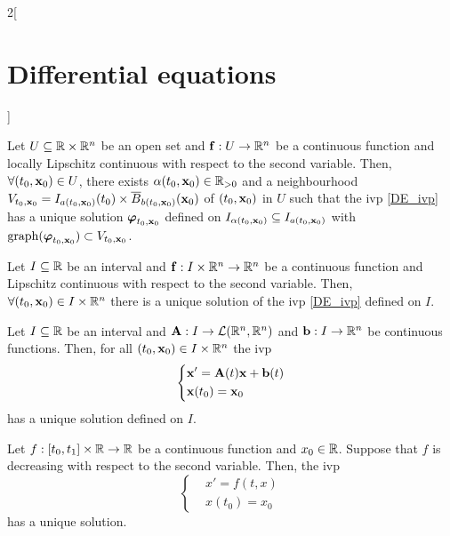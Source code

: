 \documentclass[../../../main.tex]{subfiles}
\begin{document}
\begin{multicols}{2}[\section{Differential equations}]
\begin{corollary}
    Let $U\subseteq\mathbb{R}\times\mathbb{R}^n$ be an open set and $\boldsymbol{\mathrm{f}}:U\rightarrow\mathbb{R}^n$ be a continuous function and locally Lipschitz continuous with respect to the second variable. Then, $\forall(t_0,\boldsymbol{\mathrm{x}}_0)\in U$, there exists $\alpha(t_0,\boldsymbol{\mathrm{x}}_0)\in\mathbb{R}_{>0}$ and a neighbourhood $V_{t_0,\boldsymbol{\mathrm{x}}_0}=I_{a(t_0,\boldsymbol{\mathrm{x}}_0)}(t_0)\times\overline{B}_{b(t_0,\boldsymbol{\mathrm{x}}_0)}(\boldsymbol{\mathrm{x}}_0)$ of $(t_0,\boldsymbol{\mathrm{x}}_0)$ in $U$ such that the ivp \eqref{DE_ivp} has a unique solution $\boldsymbol{\mathrm{\varphi}}_{t_0,\boldsymbol{\mathrm{x}}_0}$ defined on $I_{\alpha(t_0,\boldsymbol{\mathrm{x}}_0)}\subseteq I_{a(t_0,\boldsymbol{\mathrm{x}}_0)}$ with $\operatorname{graph}(\boldsymbol{\mathrm{\varphi}}_{t_0,\boldsymbol{\mathrm{x}}_0})\subset V_{t_0,\boldsymbol{\mathrm{x}}_0}$.
  \end{corollary}
  \begin{prop}
    Let $I\subseteq\mathbb{R}$ be an interval and $\boldsymbol{\mathrm{f}}:I\times\mathbb{R}^n\rightarrow\mathbb{R}^n$ be a continuous function and Lipschitz continuous with respect to the second variable. Then, $\forall(t_0,\boldsymbol{\mathrm{x}}_0)\in I\times\mathbb{R}^n$ there is a unique solution of the ivp \eqref{DE_ivp} defined on $I$.
  \end{prop}
  \begin{corollary}
    Let $I\subseteq\mathbb{R}$ be an interval and $\boldsymbol{\mathrm{A}}:I\rightarrow\mathcal{L}(\mathbb{R}^n,\mathbb{R}^n)$ and $\boldsymbol{\mathrm{b}}:I\rightarrow\mathbb{R}^n$ be continuous functions. Then, for all $(t_0,\boldsymbol{\mathrm{x}}_0)\in I\times\mathbb{R}^n$ the ivp
    $$
      \left\{
      \begin{aligned}
         & \boldsymbol{\mathrm{x}}'=\boldsymbol{\mathrm{A}}(t)\boldsymbol{\mathrm{x}}+\boldsymbol{\mathrm{b}}(t) \\
         & \boldsymbol{\mathrm{x}}(t_0)=\boldsymbol{\mathrm{x}}_0
      \end{aligned}
      \right.
    $$
    has a unique solution defined on $I$.
  \end{corollary}
  \begin{theorem}
    Let $f:[t_0,t_1]\times\mathbb{R}\rightarrow\mathbb{R}$ be a continuous function and $x_0\in \mathbb{R}$. Suppose that $f$ is decreasing with respect to the second variable. Then, the ivp
    \begin{equation*}
      \left\{
      \begin{aligned}
         & x'=f(t,x)  \\
         & x(t_0)=x_0
      \end{aligned}
      \right.
    \end{equation*}
    has a unique solution.
  \end{theorem}

\end{multicols}
\end{document}
